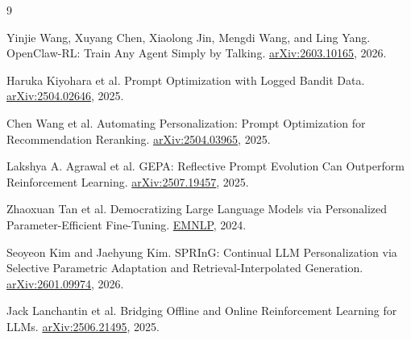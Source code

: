 \documentclass[11pt,UTF8,fontset=fandol]{ctexart}
\begin{document}
{\footnotesize\raggedright
\begin{thebibliography}{9}
\setlength{\itemsep}{1pt}

Yinjie Wang, Xuyang Chen, Xiaolong Jin, Mengdi Wang, and Ling Yang.
\newblock OpenClaw-RL: Train Any Agent Simply by Talking.
\newblock \href{https://arxiv.org/abs/2603.10165}{arXiv:2603.10165}, 2026.

Haruka Kiyohara et al.
\newblock Prompt Optimization with Logged Bandit Data.
\newblock \href{https://arxiv.org/abs/2504.02646}{arXiv:2504.02646}, 2025.

Chen Wang et al.
\newblock Automating Personalization: Prompt Optimization for Recommendation
Reranking.
\newblock \href{https://arxiv.org/abs/2504.03965}{arXiv:2504.03965}, 2025.

Lakshya A. Agrawal et al.
\newblock GEPA: Reflective Prompt Evolution Can Outperform Reinforcement
Learning.
\newblock \href{https://arxiv.org/abs/2507.19457}{arXiv:2507.19457}, 2025.

Zhaoxuan Tan et al.
\newblock Democratizing Large Language Models via Personalized
Parameter-Efficient Fine-Tuning.
\newblock \href{https://aclanthology.org/2024.emnlp-main.372/}{EMNLP}, 2024.

Seoyeon Kim and Jaehyung Kim.
\newblock SPRInG: Continual LLM Personalization via Selective Parametric
Adaptation and Retrieval-Interpolated Generation.
\newblock \href{https://arxiv.org/abs/2601.09974}{arXiv:2601.09974}, 2026.

Jack Lanchantin et al.
\newblock Bridging Offline and Online Reinforcement Learning for LLMs.
\newblock \href{https://arxiv.org/abs/2506.21495}{arXiv:2506.21495}, 2025.

\end{thebibliography}
}
\end{document}
